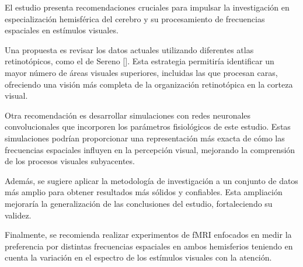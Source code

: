 \begin{recomendations}
    El estudio presenta recomendaciones cruciales para impulsar la investigación en especialización hemisférica del cerebro y su procesamiento de frecuencias espaciales en est\'imulos visuales. 
    
    Una propuesta es revisar los datos actuales utilizando diferentes atlas retinotópicos, como el de Sereno [\cite{sereno_topological_2022}]. Esta estrategia permitiría identificar un mayor número de áreas visuales superiores, incluidas las que procesan caras, ofreciendo una visión más completa de la organización retinotópica en la corteza visual.
    
    Otra recomendación es desarrollar simulaciones con redes neuronales convolucionales que incorporen los parámetros fisiológicos de este estudio. Estas simulaciones podrían proporcionar una representación más exacta de cómo las frecuencias espaciales  influyen en la percepción visual, mejorando la comprensión de los procesos visuales subyacentes.
    
    Además, se sugiere aplicar la metodología de investigación a un conjunto de datos más amplio para obtener resultados más sólidos y confiables. Esta ampliación mejoraría la generalización de las conclusiones del estudio, fortaleciendo su validez.
    
    Finalmente, se recomienda realizar experimentos de fMRI enfocados en medir la preferencia por distintas frecuencias espaciales en ambos hemisferios teniendo en cuenta la variación en el espectro de los estímulos visuales con la atenci\'on. 
    
    
    
    
    
   
\end{recomendations}
